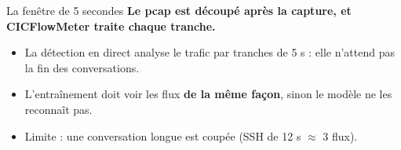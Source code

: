 \documentclass[aspectratio=169,11pt,xcolor=table]{beamer}
\newcommand{\espacement}{\setlength{\itemsep}{.7em}}
\begin{document}
\begin{frame}{La fenêtre de 5 secondes}
  \textbf{Le pcap est découpé après la capture, et CICFlowMeter traite chaque tranche.}
  \vspace{.5em}
  \begin{itemize}\espacement
    \item La détection en direct analyse le trafic par tranches de 5 s : elle n'attend pas la fin des conversations.
    \item L'entraînement doit voir les flux \textbf{de la même façon}, sinon le modèle ne les reconnaît pas.
    \item Limite : une conversation longue est coupée (SSH de 12 s $\approx$ 3 flux).
  \end{itemize}
\end{frame}
\end{document}

